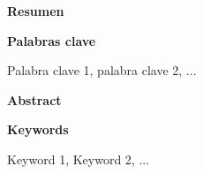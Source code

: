 \documentclass{article}
\begin{document}
\newpage

\thispagestyle{empty}

\begin{center}
{\bf \Huge Resumen}
\end{center}
\onehalfspacing



\begin{center}
{\bf \Large Palabras clave}
\end{center}
Palabra clave 1, palabra clave 2, ...

\newpage

\thispagestyle{empty}

\begin{center}
{\bf \Huge Abstract}
\end{center}



\begin{center}
{\bf \Large Keywords}
\end{center}
Keyword 1, Keyword 2, ...

\newpage





\tableofcontents
\newpage
\listoffigures
\newpage
\listoftables
\newpage
\newpage


\newpage


\newpage


\newpage


\end{document}
